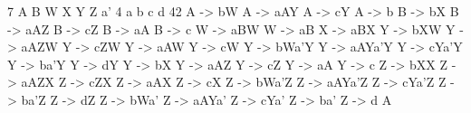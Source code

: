 7
A B W X Y Z a' 
4
a b c d 
42
A -> bW
A -> aAY
A -> cY
A -> b
B -> bX
B -> aAZ
B -> cZ
B -> aA
B -> c
W -> aBW
W -> aB
X -> aBX
Y -> bXW
Y -> aAZW
Y -> cZW
Y -> aAW
Y -> cW
Y -> bWa'Y
Y -> aAYa'Y
Y -> cYa'Y
Y -> ba'Y
Y -> dY
Y -> bX
Y -> aAZ
Y -> cZ
Y -> aA
Y -> c
Z -> bXX
Z -> aAZX
Z -> cZX
Z -> aAX
Z -> cX
Z -> bWa'Z
Z -> aAYa'Z
Z -> cYa'Z
Z -> ba'Z
Z -> dZ
Z -> bWa'
Z -> aAYa'
Z -> cYa'
Z -> ba'
Z -> d
A